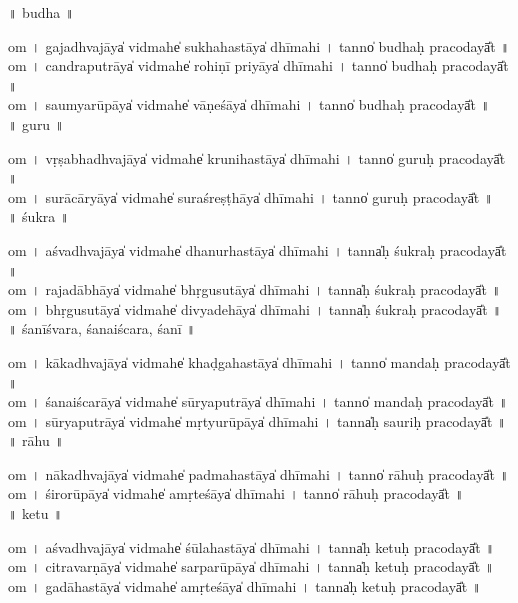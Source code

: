 \documentclass[parskip, DIV=14]{scrartcl}
\begin{document}
\vspace{0.201cm} ॥   budha  ॥ \par
  om  । ga॒ja॒dhva॒jāya̍ vi॒dmahe̍ sukhaha॒stāya̍ dhīmahi  ।  tanno̍ budhaḥ praco॒dayā̎t ॥ \\
  om  । ca॒ndra॒pu॒trāya̍ vi॒dmahe̍ rohiṇī pri॒yāya̍ dhīmahi  ।  tanno̍ budhaḥ praco॒dayā̎t ॥ \\
  om  । sau॒mya॒rū॒pāya̍ vi॒dmahe̍ vāṇe॒śāya̍ dhīmahi  ।  tanno̍ budhaḥ praco॒dayā̎t ॥ \\  
  
\vspace{0.201cm} ॥   guru  ॥  \par
  om  । vṛ॒ṣa॒bha॒dhva॒jāya̍ vi॒dmahe̍ kruniha॒stāya̍ dhīmahi  ।  tanno̍ guruḥ praco॒dayā̎t ॥ \\
  om  । su॒rā॒cā॒ryāya̍ vi॒dmahe̍ suraśre॒ṣṭhāya̍ dhīmahi  ।  tanno̍ guruḥ praco॒dayā̎t ॥ \\  

\vspace{0.201cm} ॥   śukra  ॥ \par
  om  । a॒śva॒dhva॒jāya̍ vi॒dmahe̍ dhanurha॒stāya̍ dhīmahi  ।  tanna̍ḥ śukraḥ praco॒dayā̎t ॥ \\
  om  । ra॒ja॒dā॒bhāya̍ vi॒dmahe̍ bhṛgusu॒tāya̍ dhīmahi  ।  tanna̍ḥ śukraḥ praco॒dayā̎t ॥ \\
  om  । bhṛ॒gu॒su॒tāya̍ vi॒dmahe̍ divyade॒hāya̍ dhīmahi  ।  tanna̍ḥ śukraḥ praco॒dayā̎t ॥ \\

\vspace{0.201cm} ॥   śanīśvara, śanaiścara, śanī  ॥ \par
  om  । kā॒ka॒dhva॒jāya̍ vi॒dmahe̍ khaḍgaha॒stāya̍ dhīmahi  ।  tanno̍ mandaḥ praco॒dayā̎t ॥ \\
  om  । śa॒nai॒śca॒rāya̍ vi॒dmahe̍ sūryapu॒trāya̍ dhīmahi  ।  tanno̍ mandaḥ praco॒dayā̎t ॥ \\
  om  । sū॒rya॒pu॒trāya̍ vi॒dmahe̍ mṛtyurū॒pāya̍ dhīmahi  ।  tanna̍ḥ sauriḥ praco॒dayā̎t ॥ \\

\vspace{0.201cm} ॥   rāhu  ॥ \par
  om  । nā॒ka॒dhva॒jāya̍ vi॒dmahe̍ padmaha॒stāya̍ dhīmahi  ।  tanno̍ rāhuḥ praco॒dayā̎t ॥ \\
  om  । śi॒ro॒rū॒pāya̍ vi॒dmahe̍ amṛte॒śāya̍ dhīmahi  ।  tanno̍ rāhuḥ praco॒dayā̎t ॥ \\

\vspace{0.201cm} ॥   ketu  ॥ \par
  om  । a॒śva॒dhva॒jāya̍ vi॒dmahe̍ śūlaha॒stāya̍ dhīmahi  ।  tanna̍ḥ ketuḥ praco॒dayā̎t ॥ \\
  om  । ci॒tra॒va॒rṇāya̍ vi॒dmahe̍ sarparū॒pāya̍ dhīmahi  ।  tanna̍ḥ ketuḥ praco॒dayā̎t ॥ \\
  om  । ga॒dā॒ha॒stāya̍ vi॒dmahe̍ amṛte॒śāya̍ dhīmahi  ।  tanna̍ḥ ketuḥ praco॒dayā̎t ॥ \\
\end{document}
